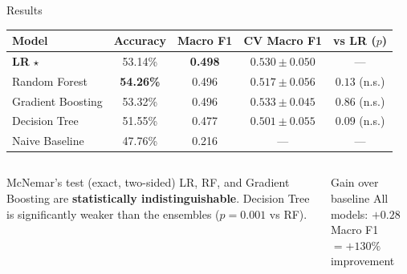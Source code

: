 \documentclass[10pt,aspectratio=169]{beamer}
\begin{document}
\begin{frame}{Results}
  \begin{center}
    \begin{tabular}{lcccc}
      \toprule
      \textbf{Model} & \textbf{Accuracy} & \textbf{Macro F1}
        & \textbf{CV Macro F1} & \textbf{vs LR ($p$)} \\
      \midrule
      \rowcolor{LightBlue}
      \textbf{LR} $\star$ & 53.14\% & \textbf{0.498} & $0.530 \pm 0.050$ & --- \\
      Random Forest & \textbf{54.26\%} & 0.496 & $0.517 \pm 0.056$ & $0.13$ (n.s.) \\
      Gradient Boosting & 53.32\% & 0.496 & $\mathbf{0.533 \pm 0.045}$ & $0.86$ (n.s.) \\
      Decision Tree & 51.55\% & 0.477 & $0.501 \pm 0.055$ & $0.09$ (n.s.) \\
      \midrule
      Naive Baseline & 47.76\% & 0.216 & --- & --- \\
      \bottomrule
    \end{tabular}
  \end{center}

  \begin{columns}[T]
      \begin{alertblock}{McNemar's test (exact, two-sided)}
        LR, RF, and Gradient Boosting are \textbf{statistically indistinguishable}.
        Decision Tree is significantly weaker than the ensembles ($p = 0.001$ vs RF).
      \end{alertblock}
      \begin{block}{Gain over baseline}
        All models: $+0.28$ Macro F1 \\
        $= +130\%$ improvement
      \end{block}
  \end{columns}
\end{frame}
\end{document}
